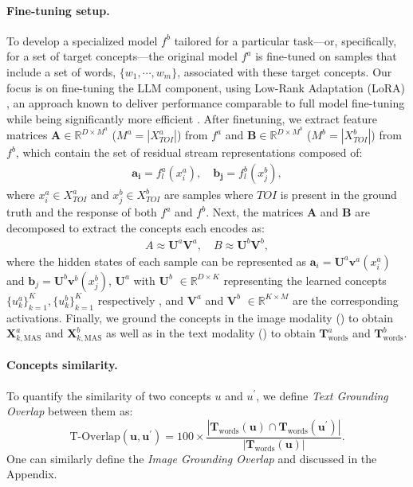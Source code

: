 \paragraph{Fine-tuning setup.} To develop a specialized model $f^b$ tailored for a particular task—or, specifically, for a set of target concepts—the original model $f^a$ is fine-tuned on samples that include a set of words, $\{w_1, \cdots, w_m\}$, associated with these target concepts. Our focus is on fine-tuning the LLM component, using Low-Rank Adaptation (LoRA) \cite{Hu2021LoRALA}, an approach known to deliver performance comparable to full model fine-tuning while being significantly more efficient \cite{liu2024improvedllava,laurenccon2024mattersidefics2}.
After finetuning, we extract feature matrices $\bm{A} \in \mathbb{R}^{D \times M^a}$ ($M^a=|X_\textit{TOI}^a|$) from $f^a$ and $\bm{B} \in \mathbb{R}^{D \times M^b}$ ($M^b=|X_\textit{TOI}^b|$) from $f^b$, which contain the set of residual stream representations composed of:
\begin{align*}
    \bm{a_i} = f_{l}^a(x^a_i), \quad \bm{b_j} = f_{l}^b(x^b_j),
\end{align*}
where $x^a_i \in X_\textit{TOI}^a$ and $x^b_j \in X_\textit{TOI}^b$ are samples where $\textit{TOI}$ is present in the ground truth and the response of both $f^a$ and $f^b$. Next, the matrices $\bm{A}$ and $\bm{B}$ are decomposed to extract the concepts each encodes as:
\begin{align*}
    A \approx \bm{U}^a \bm{V}^a , \quad B \approx \bm{U}^b \bm{V}^b ,
\end{align*}
where the hidden states of each sample can be represented as $\bm{a}_i = \bm{U}^a \bm{v}^a(x^a_i)$ and $\bm{b}_j = \bm{U}^b \bm{v}^b(x^b_j)$, \( \bm{U}^a \) with \( \bm{U}^b \) \( \in \mathbb{R}^{D \times K} \) representing the learned concepts $\{u^a_k\}_{k=1}^{K}, \{u^b_k\}_{k=1}^{K}$ respectively %
, and \( \bm{V}^a \) and \(\bm{V}^b\) \( \in \mathbb{R}^{K \times M} \) are the corresponding activations. 
Finally, we ground the concepts in the image modality () to obtain $\bm{X}_{k, \text{MAS}}^a$ and $\bm{X}_{k, \text{MAS}}^b$ as well as in the text modality () to obtain  $\bm{T}_{\text{words}}^a$ and $\bm{T}_{\text{words}}^b$.


\paragraph{Concepts similarity.}
To quantify the similarity of two concepts $u$ and $u^\prime$, we define \textit{Text Grounding Overlap} between them as:
\begin{equation}
   \text{T-Overlap}(\bm{u}, \bm{u}^\prime) = 100 \times \frac{ \left| \bm{T}_{\text{words}}(\bm{u}) \cap \bm{T}_{\text{words}}(\bm{u}^\prime) \right|}{ \left| \bm{T}_{\text{words}}(\bm{u})\right|}.
    \label{eq:text-overlap}
\end{equation}
One can similarly define the \textit{Image Grounding Overlap} and discussed in the Appendix.





